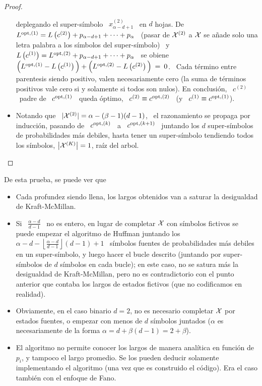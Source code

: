 \begin{proof}
\begin{itemize}
    deplegando el super-s\'imbolo \ $x^{(2)}_{\alpha-d+1}$ \ en $d$ hojas.  De \
    $L^{\mathrm{opt},(1)}  =  L\left(  c^{(2)}  \right)  +  p_{\alpha-d+1}  +  \cdots  +
    p_\alpha$ \ (pasar de $\mathcal{X}^{(2)}$ a  $\mathcal{X}$ se a\~nade solo una letra palabra a
    los  s\'imbolos  del super-s\'imbolo)  \  y  \  $L\left( c^{(1)}  \right)  =
    L^{\mathrm{opt},(2)}  + p_{\alpha-d+1} +  \cdots +  p_\alpha$ \  se obiene  \ $\Big(
    L^{\mathrm{opt},(1)} - L\left( c^{(1)} \right)  \Big) + \Big( L^{\mathrm{opt},(2)} - L\left(
      c^{(2)}  \right) \Big)  \: =  \: 0$.   \ Cada  t\'ermino  entre parentesis
    siendo positivo, valen necesariamente  cero (la suma de t\'erminos positivos
    vale cero si y solamente si  todos son nulos).  En conclusi\'on, \ $c^{(2)}$
    \  padre   de  \  $c^{\mathrm{opt},(1)}$   \  queda  \'optimo,  \   $c^{(2)}  \equiv
    c^{\mathrm{opt},(2)}$ \ (y \ $c^{(1)} \equiv c^{\mathrm{opt},(1)}$).
  \item Notando que \ $|\mathcal{X}^{(2)}| = \alpha - (\beta-1) (d-1)$, \ el razonamiento
    se   propaga  por   inducci\'on,  pasando   de  \   $c^{\mathrm{opt},(k)}$  \   a  \
    $c^{\mathrm{opt},(k+1)}$ \ juntando los $d$ super-s\'imbolos de probabilidades m\'as
    debiles,  hasta tener  un  super-s\'imbolo tendiendo  todos los  s\'imbolos,
    $\left| \mathcal{X}^{(K)} \right| = 1$, ra\'iz del arbol.
\end{itemize}
\end{proof}
%
De esta  prueba, se puede ver que
%
\begin{itemize}
\item  Cada  profundez siendo  llena,  los largos  obtenidos  van  a saturar  la
  desigualdad de Kraft-McMillan.
%
\item Si \ $\frac{\alpha  - d}{d-1}$ \ no es entero, en  lugar de completar $\mathcal{X}$
  con s\'imbolos fictivos se puede  empezar el algoritmo de Huffman juntando los
  \ $\alpha - d - \left\lfloor \frac{\alpha - d}{d-1} \right\rfloor (d-1) + 1$ \
  s\'imbolos fuentes  de probabilidades m\'as  debiles en un  super-s\'imbolo, y
  luego hacer el bucle descrito (juntando por super-s\'imbolos de $d$ s\'imbolos
  en  cada  bucle);  en  este  caso,  no  se  satura  m\'as  la  desigualdad  de
  Kraft-McMillan, pero  no es contradictorio  con el punto anterior  que contaba
  los largos de estados fictivos (que no codificamos en realidad).
%
\item Obviamente, en el caso binario $d = 2$, no es necesario completar $\mathcal{X}$ por
  estados fuentes, o  empezar con menos de $d$  s\'imbolos juntados ($\alpha$ es
  necesariamente de la forma $\alpha = d + \beta (d-1) = 2 + \beta$).
%
\item  El algoritmo  no  permite conocer  los  largos de  manera anal\'itica  en
  funci\'on  de $p_i$,  y  tampoco el  largo  promedio.  Se  los pueden  deducir
  solamente  implementando   el  algoritmo  (una   vez  que  es   construido  el
  c\'odigo). Era el caso tambi\'en con el enfoque de Fano.
\end{itemize}

